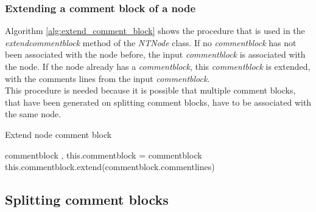\subsubsection{Extending a comment block of a node}\label{sec:ImplementationMaintainingExtendCommentBlock}

Algorithm \ref{alg:extend_comment_block} shows the procedure that is used in the \textit{extend\textunderscore comment\textunderscore block} method of the \textit{NTNode} class.
If no \textit{comment\textunderscore block} has not been associated with the node before, the input \textit{comment\textunderscore block} is associated with the node.
If the node already has a \textit{comment\textunderscore block}, this \textit{comment\textunderscore block} is extended, with the comments lines from the input \textit{comment\textunderscore block}.\\
This procedure is needed because it is possible that multiple comment blocks, that have been generated on splitting comment blocks, have to be associated with the same node.

\begin{algorithm}[H]
\small
\caption{Extend node comment block}
\begin{algorithmic}[1]
\algrenewcommand\algorithmicindent{0.4em}
\Require comment\textunderscore block
‚
	\State this.comment\textunderscore block = comment\textunderscore block
\Else
	\State this.comment\textunderscore block.extend(comment\textunderscore block.comment\textunderscore lines)
\EndIf
\end{algorithmic}
\label{alg:extend_comment_block}
\end{algorithm}


\subsection{Splitting comment blocks}\label{sec:ImplementationMaintainingCommentsSplitByTop}

